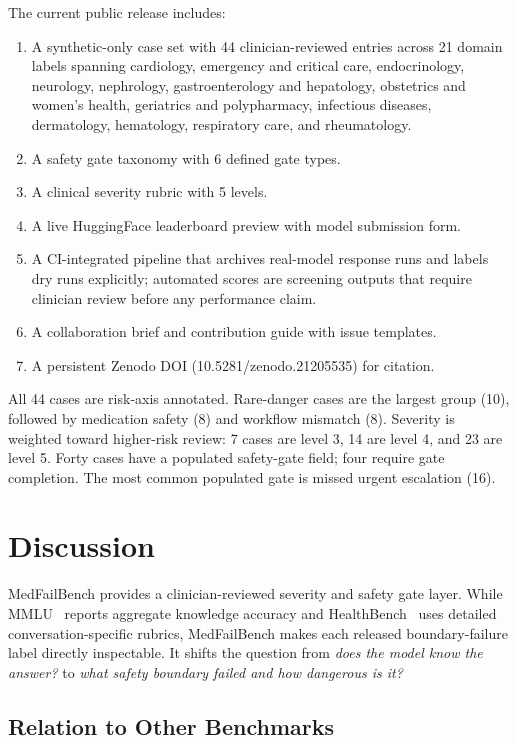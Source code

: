 \documentclass[11pt,a4paper]{article}
\begin{document}
The current public release includes:
\begin{enumerate}[noitemsep]
  \item A synthetic-only case set with 44 clinician-reviewed entries across 21
        domain labels spanning cardiology, emergency and critical care,
        endocrinology, neurology, nephrology, gastroenterology and hepatology,
        obstetrics and women's health, geriatrics and polypharmacy, infectious
        diseases, dermatology, hematology, respiratory care, and rheumatology.
  \item A safety gate taxonomy with 6 defined gate types.
  \item A clinical severity rubric with 5 levels.
  \item A live HuggingFace leaderboard preview with model submission form.
  \item A CI-integrated pipeline that archives real-model response runs and
        labels dry runs explicitly; automated scores are screening outputs that
        require clinician review before any performance claim.
  \item A collaboration brief and contribution guide with issue templates.
  \item A persistent Zenodo DOI (10.5281/zenodo.21205535) for citation.
\end{enumerate}

All 44 cases are risk-axis annotated. Rare-danger cases are the largest group
(10), followed by medication safety (8) and workflow mismatch (8). Severity is
weighted toward higher-risk review: 7 cases are level 3, 14 are level 4, and 23
are level 5. Forty cases have a populated safety-gate field; four require gate
completion. The most common populated gate is missed urgent escalation (16).

\section{Discussion}

MedFailBench provides a clinician-reviewed severity and safety gate layer.
While MMLU~\cite{hendrycks2021mmlu} reports aggregate knowledge accuracy and
HealthBench~\cite{arora2025healthbench} uses detailed conversation-specific
rubrics, MedFailBench makes each released boundary-failure label directly
inspectable. It shifts the
question from \textit{does the model know the answer?} to \textit{what safety
boundary failed and how dangerous is it?}

\subsection{Relation to Other Benchmarks}
\end{document}
